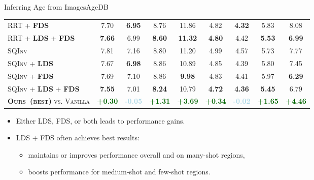 \begin{frame}{Inferring Age from Images}{AgeDB}
\begin{table}[t]
\begin{center}
{\begin{tabular}{l|cccc|cccc}
					\textsc{RRT} + \textbf{\textsc{FDS}}     & {7.70} & \textbf{6.95} & {8.76}   & {11.86} & {4.82} & \textbf{4.32} & {5.83}   & {8.08}  \\[1.2pt]
					\textsc{RRT} + \textbf{\textsc{LDS}} + \textbf{\textsc{FDS}}     & \textbf{7.66} & 6.99 & \textbf{8.60}   & \textbf{11.32} & \textbf{4.80} & 4.42 & \textbf{5.53}   & \textbf{6.99}  \\ \midrule\midrule
					\textsc{SQInv}      & 7.81 & 7.16 & 8.80   & 11.20 & 4.99 & 4.57 & 5.73   & 7.77  \\[1.2pt]
					\textsc{SQInv} + \textbf{\textsc{LDS}} & 7.67 & \textbf{6.98} & 8.86   & 10.89 & 4.85 & {4.39} &  5.80  & {7.45}  \\[1.2pt]
					\textsc{SQInv} + \textbf{\textsc{FDS}} & 7.69 & 7.10 & 8.86   & \textbf{9.98} & 4.83 & {4.41} &  5.97  & \textbf{6.29}  \\[1.2pt]
					\textsc{SQInv} + \textbf{\textsc{LDS}} + \textbf{\textsc{FDS}} & \textbf{7.55} &  7.01  & \textbf{8.24}   & 10.79 & \textbf{4.72} & \textbf{4.36} & \textbf{5.45}  & {6.79}  \\ \midrule\midrule
					\textsc{\textbf{Ours~(best)} vs. Vanilla}   & \textcolor{darkgreen}{\textbf{+0.30}} & \textcolor{lightblue}{\textbf{-0.05}} & \textcolor{darkgreen}{\textbf{+1.31}} & \textcolor{darkgreen}{\textbf{+3.69}} & \textcolor{darkgreen}{\textbf{+0.34}} & \textcolor{lightblue}{\textbf{-0.02}} & \textcolor{darkgreen}{\textbf{+1.65}} & \textcolor{darkgreen}{\textbf{+4.46}} \\
					\bottomrule[1.5pt]
				\end{tabular}
			}
		\end{center}
	\end{table}
	\begin{itemize}\fontsize{7pt}{7.2}\selectfont
		\item Either LDS, FDS, or both leads to performance gains.
		\item LDS + FDS often achieves best results:
		\begin{itemize}\fontsize{7pt}{7.2}\selectfont
			\item maintains or improves performance overall
			and on many-shot regions,
			\item boosts performance for medium-shot and few-shot regions.
		\end{itemize}
	\end{itemize}
\end{frame}

